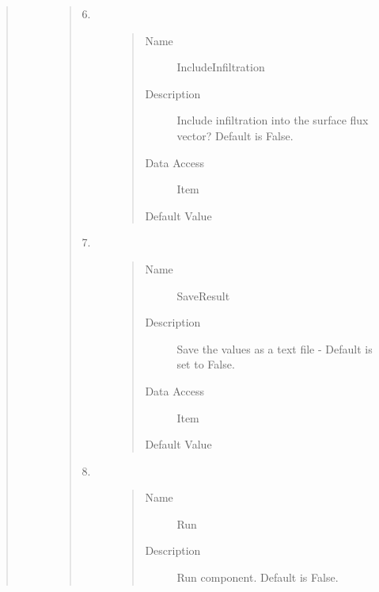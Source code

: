 \documentclass[letterpaper,10pt,english]{sphinxmanual}
\begin{document}
\begin{quote}
\begin{description}
\begin{quote}
\begin{description}
\begin{quote}
\begin{description}
\end{description}\end{quote}

\item[{6.}] \leavevmode\begin{quote}\begin{description}
\item[{Name}] \leavevmode
IncludeInfiltration

\item[{Description}] \leavevmode
Include infiltration into the surface flux vector? Default is False.

\item[{Data Access}] \leavevmode
Item

\item[{Default Value}] \leavevmode
{}

\end{description}\end{quote}

\item[{7.}] \leavevmode\begin{quote}\begin{description}
\item[{Name}] \leavevmode
SaveResult

\item[{Description}] \leavevmode
Save the values as a text file - Default is set to False.

\item[{Data Access}] \leavevmode
Item

\item[{Default Value}] \leavevmode
{}

\end{description}\end{quote}

\item[{8.}] \leavevmode\begin{quote}\begin{description}
\item[{Name}] \leavevmode
Run

\item[{Description}] \leavevmode
Run component. Default is False.


\end{description}
\end{quote}
\end{description}
\end{quote}
\end{description}
\end{quote}
\end{document}
